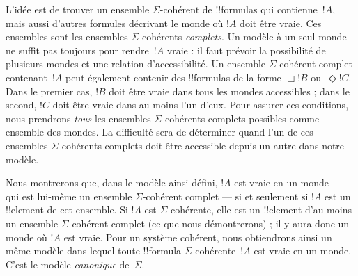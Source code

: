 \documentclass[../../../include/open-logic-section]{subfiles}
\begin{document}
L'idée est de trouver un ensemble $\Sigma$-cohérent de !!{formula}s
qui contienne~$!A$, mais aussi d'autres formules décrivant le
monde où $!A$ doit être vraie. Ces ensembles sont les ensembles
$\Sigma$-cohérents \emph{complets}. Un modèle à un seul monde ne suffit
pas toujours pour rendre~$!A$ vraie : il faut prévoir la possibilité
de plusieurs mondes et une relation d'accessibilité. Un
ensemble $\Sigma$-cohérent complet contenant~$!A$ peut également
contenir des !!{formula}s de la forme $\Box !B$ ou~$\Diamond !C$.
Dans le premier cas, $!B$ doit être vraie dans tous les mondes
accessibles ; dans le second, $!C$ doit être vraie dans au
moins l'un d'eux. Pour assurer ces conditions, nous prendrons
\emph{tous} les ensembles $\Sigma$-cohérents complets possibles comme
ensemble des mondes. La difficulté sera de déterminer quand l'un de
ces ensembles $\Sigma$-cohérents complets doit être accessible depuis un autre dans notre modèle.

Nous montrerons que, dans le modèle ainsi défini, $!A$ est vraie en
un monde --- qui est lui-même un ensemble $\Sigma$-cohérent complet
--- si et seulement si $!A$ est un !!{element} de cet ensemble. Si
$!A$ est $\Sigma$-cohérente, elle est un !!{element} d'au moins un ensemble
$\Sigma$-cohérent complet (ce que nous démontrerons) ; il y aura donc
un monde où $!A$ est vraie. Pour un système cohérent, nous obtiendrons ainsi un même modèle
dans lequel toute !!{formula} $\Sigma$-cohérente~$!A$ est vraie en un
monde. C'est le modèle \emph{canonique} de~$\Sigma$.
\end{document}

